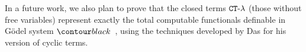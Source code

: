 
In a future work, we also plan to prove that the closed terms ${ {\tt CT}\mbox{-}\lambda}$ 
(those without free variables) represent exactly the total computable functionals 
definable in G\"{o}del system $\systemT$, using the techniques developed by 
Das for his version of cyclic terms.



